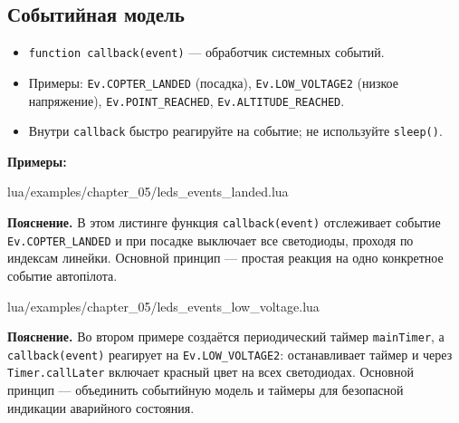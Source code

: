\subsection{Событийная модель}
\begin{itemize}
  \item \verb|function callback(event)| — обработчик системных событий.
  \item Примеры: \verb|Ev.COPTER_LANDED| (посадка), \verb|Ev.LOW_VOLTAGE2| (низкое напряжение), \verb|Ev.POINT_REACHED|, \verb|Ev.ALTITUDE_REACHED|.
  \item Внутри \verb|callback| быстро реагируйте на событие; не используйте \verb|sleep()|.
\end{itemize}
\textbf{Примеры:}
\begin{codefile}{lua/examples/chapter_05/leds_events_landed.lua}
\end{codefile}
\textbf{Пояснение.} В этом листинге функция \verb|callback(event)| отслеживает событие \verb|Ev.COPTER_LANDED| и при посадке выключает все светодиоды, проходя по индексам линейки. Основной принцип — простая реакция на одно конкретное событие автопілота.
\begin{codefile}{lua/examples/chapter_05/leds_events_low_voltage.lua}
\end{codefile}
\textbf{Пояснение.} Во втором примере создаётся периодический таймер \verb|mainTimer|, а \verb|callback(event)| реагирует на \verb|Ev.LOW_VOLTAGE2|: останавливает таймер и через \verb|Timer.callLater| включает красный цвет на всех светодиодах. Основной принцип — объединить событийную модель и таймеры для безопасной индикации аварийного состояния.
